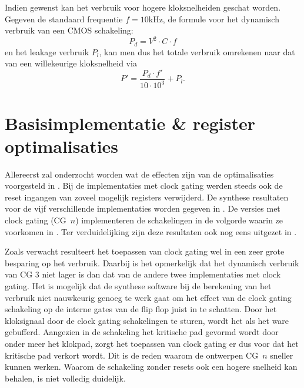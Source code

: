 
Indien gewenst kan het verbruik voor hogere kloksnelheiden geschat worden. Gegeven de standaard frequentie $f = 10$kHz, de formule voor het dynamisch verbruik van een CMOS schakeling:
\[P_d = V^2 \cdot C \cdot f\]
en het leakage verbruik $P_l$, kan men dus het totale verbruik omrekenen naar dat van een willekeurige kloksnelheid via
\[P' = \frac{P_d \cdot f'}{10 \cdot 10^3} + P_l.\]

\section{Basisimplementatie \& register optimalisaties\label{section-resultaten-basisimplementatie}}

Allereerst zal onderzocht worden wat de effecten zijn van de optimalisaties voorgesteld in . Bij de implementaties met clock gating werden steeds ook de reset ingangen van zoveel mogelijk registers verwijderd. De synthese resultaten voor de vijf verschillende implementaties worden gegeven in . De versies met clock gating (CG~$n$) implementeren de schakelingen in de volgorde waarin ze voorkomen in . Ter verduidelijking zijn deze resultaten ook nog eens uitgezet in .


Zoals verwacht resulteert het toepassen van clock gating wel in een zeer grote besparing op het verbruik. Daarbij is het opmerkelijk dat het dynamisch verbruik van CG 3 niet lager is dan dat van de andere twee implementaties met clock gating. Het is mogelijk dat de synthese software bij de berekening van het verbruik niet nauwkeurig genoeg te werk gaat om het effect van de clock gating schakeling op de interne gates van de flip flop juist in te schatten. Door het kloksignaal door de clock gating schakelingen te sturen, wordt het als het ware gebufferd. Aangezien in de schakeling het kritische pad gevormd wordt door onder meer het klokpad, zorgt het toepassen van clock gating er dus voor dat het kritische pad verkort wordt.  Dit is de reden waarom de ontwerpen CG~$n$ sneller kunnen werken. Waarom de schakeling zonder resets ook een hogere snelheid kan behalen, is niet volledig duidelijk.

